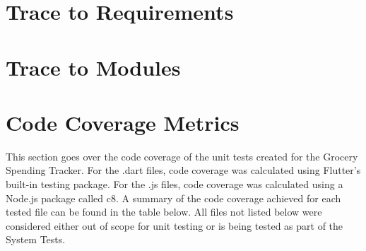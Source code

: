 \documentclass[12pt, titlepage]{article}
\begin{document}
\section{Trace to Requirements}
		
\section{Trace to Modules}		

\section{Code Coverage Metrics}

This section goes over the code coverage of the unit tests created for the Grocery Spending Tracker.
For the .dart files, code coverage was calculated using Flutter's built-in testing package. For the .js files,
code coverage was calculated using a Node.js package called c8. A summary of the code coverage achieved for
each tested file can be found in the table below. All files not listed below were considered either out of scope for
unit testing or is being tested as part of the System Tests.
\end{document}
